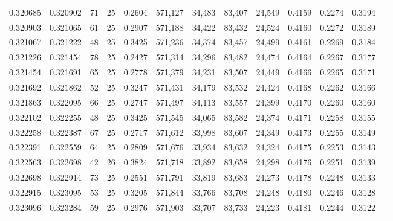 \begin{tabular}{rrrrrrrrrrrrr}
0.320685 & 0.320902 &    71 &  25 &                                     0.2604 & 571,127 &  34,483 &  83,407 &  24,549 & 0.4159 & 0.2274 & 0.3194 \\
0.320903 & 0.321065 &    61 &  25 &                                     0.2907 & 571,188 &  34,422 &  83,432 &  24,524 & 0.4160 & 0.2272 & 0.3189 \\
0.321067 & 0.321222 &    48 &  25 &                                     0.3425 & 571,236 &  34,374 &  83,457 &  24,499 & 0.4161 & 0.2269 & 0.3184 \\
0.321226 & 0.321454 &    78 &  25 &                                     0.2427 & 571,314 &  34,296 &  83,482 &  24,474 & 0.4164 & 0.2267 & 0.3177 \\
0.321454 & 0.321691 &    65 &  25 &                                     0.2778 & 571,379 &  34,231 &  83,507 &  24,449 & 0.4166 & 0.2265 & 0.3171 \\
0.321692 & 0.321862 &    52 &  25 &                                     0.3247 & 571,431 &  34,179 &  83,532 &  24,424 & 0.4168 & 0.2262 & 0.3166 \\
0.321863 & 0.322095 &    66 &  25 &                                     0.2747 & 571,497 &  34,113 &  83,557 &  24,399 & 0.4170 & 0.2260 & 0.3160 \\
0.322102 & 0.322255 &    48 &  25 &                                     0.3425 & 571,545 &  34,065 &  83,582 &  24,374 & 0.4171 & 0.2258 & 0.3155 \\
0.322258 & 0.322387 &    67 &  25 &                                     0.2717 & 571,612 &  33,998 &  83,607 &  24,349 & 0.4173 & 0.2255 & 0.3149 \\
0.322391 & 0.322559 &    64 &  25 &                                     0.2809 & 571,676 &  33,934 &  83,632 &  24,324 & 0.4175 & 0.2253 & 0.3143 \\
0.322563 & 0.322698 &    42 &  26 &                                     0.3824 & 571,718 &  33,892 &  83,658 &  24,298 & 0.4176 & 0.2251 & 0.3139 \\
0.322698 & 0.322914 &    73 &  25 &                                     0.2551 & 571,791 &  33,819 &  83,683 &  24,273 & 0.4178 & 0.2248 & 0.3133 \\
0.322915 & 0.323095 &    53 &  25 &                                     0.3205 & 571,844 &  33,766 &  83,708 &  24,248 & 0.4180 & 0.2246 & 0.3128 \\
0.323096 & 0.323284 &    59 &  25 &                                     0.2976 & 571,903 &  33,707 &  83,733 &  24,223 & 0.4181 & 0.2244 & 0.3122 \\

\end{tabular}
